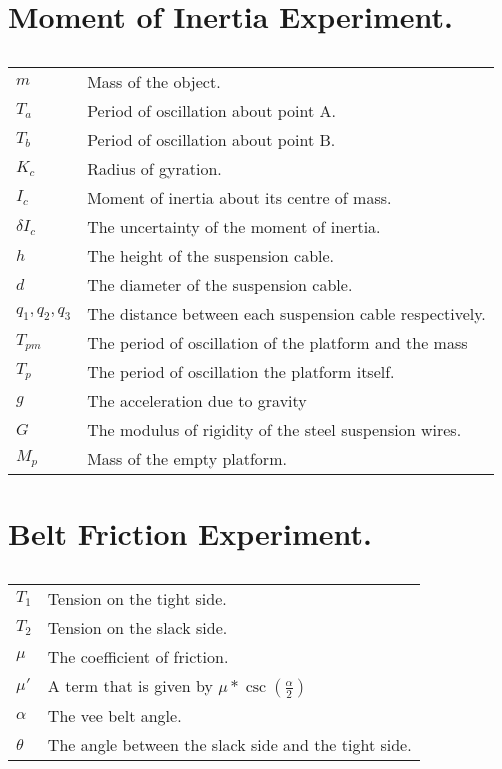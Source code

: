 \section*{Moment of Inertia Experiment.}
\begin{table}[H]
\begin{tabular}{ll}
$m$             & Mass of the object.                                      \\
$T_a$           & Period of oscillation about point A.                     \\
$T_b$           & Period of oscillation about point B.                     \\
$K_c$           & Radius of gyration.                                      \\
$I_c$           & Moment of inertia about its centre of mass.              \\
$\delta I_c$    & The uncertainty of the moment of inertia.                \\
$h$             & The height of the suspension cable.                      \\
$d$             & The diameter of the suspension cable.                    \\
$q_1, q_2, q_3$ & The distance between each suspension cable respectively. \\
$T_{pm}$        & The period of oscillation of the platform and the mass   \\
$T_p$           & The period of oscillation the platform itself.           \\
$g$             & The acceleration due to gravity                          \\
$G$             & The modulus of rigidity of the steel suspension wires.   \\
$M_p$           & Mass of the empty platform.                     
\end{tabular}
\caption*{}
\label{tab:my-table}
\end{table}

\section*{Belt Friction Experiment.}
\begin{table}[H]
\begin{tabular}{ll}
$T_1$                   & Tension on the tight side.                                       \\
$T_2$                   & Tension on the slack side.                                       \\
$\mu$                   & The coefficient of friction.                                     \\
$\mu '$                 & A term that is given by $\mu *\csc\left(\frac{\alpha}{2}\right)$ \\
$\alpha$ & The vee belt angle.                                              \\
$\theta$                & The angle between the slack side and the tight side.            
\end{tabular}
\caption*{}
\label{tab:my-table}
\end{table}

